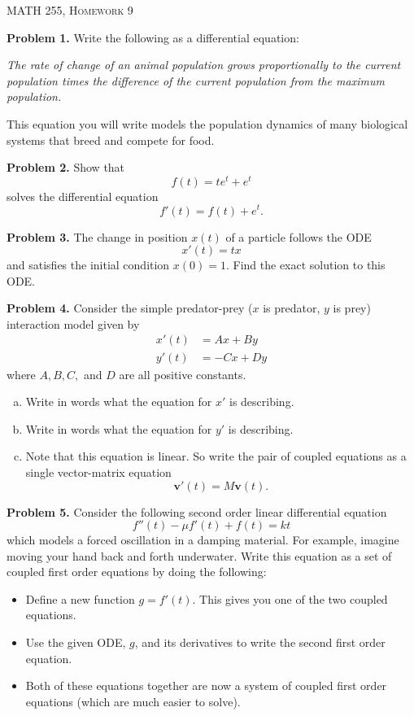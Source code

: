 \documentclass[12pt]{report} %
\theoremstyle{definition}
\begin{document}
\begin{center}
   \textsc{\large MATH 255, Homework 9}\\
\end{center}
\vspace{.5cm}

\noindent\textbf{Problem 1.} Write the following as a differential equation:

\emph{The rate of change of an animal population grows proportionally to the current population times the difference of the current population from the maximum population.}

This equation you will write models the population dynamics of many biological systems that breed and compete for food.
\vspace*{.5cm}

\noindent\textbf{Problem 2.} Show that 
\[
f(t)=te^{t}+e^t
\]
solves the differential equation
\[
f'(t)=f(t)+e^t.
\]
\vspace*{.5cm}

\noindent\textbf{Problem 3.} The change in position $x(t)$ of a particle follows the ODE
\[
x'(t)=tx
\]
and satisfies the initial condition $x(0)=1$.  Find the exact solution to this ODE.
\vspace*{.5cm}

\noindent\textbf{Problem 4.} Consider the simple predator-prey ($x$ is predator, $y$ is prey) interaction model given by
\begin{align*}
    x'(t) &= Ax+ B y\\
    y'(t) &= -C x + Dy
\end{align*}
where $A,B,C,$ and $D$ are all positive constants.
\begin{enumerate}[(a)]
    \item Write in words what the equation for $x'$ is describing.
    \item Write in words what the equation for $y'$ is describing.
    \item Note that this equation is linear.  So write the pair of coupled equations as a single vector-matrix equation
    \[
    \mathbf{v}'(t) = M\mathbf{v}(t).
    \]
\end{enumerate}

\noindent\textbf{Problem 5.} Consider the following second order linear differential equation
\[
f''(t)-\mu f'(t) + f(t) = kt
\]
which models a forced oscillation in a damping material.  For example, imagine moving your hand back and forth underwater.  Write this equation as a set of coupled first order equations by doing the following:
\begin{itemize}
    \item Define a new function $g=f'(t)$.  This gives you one of the two coupled equations.
    \item Use the given ODE, $g$, and its derivatives to write the second first order equation.
    \item Both of these equations together are now a system of coupled first order equations (which are much easier to solve).
\end{itemize}
\end{document}
